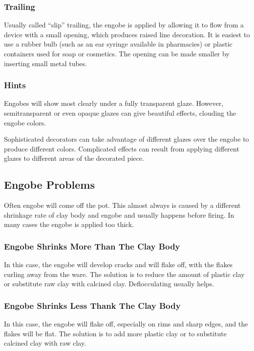 \subsubsection{Trailing}
Usually called ``slip'' trailing, the engobe is applied by allowing it to flow 
from a device with a small opening, which produces raised line decoration. It 
is easiest to use a rubber bulb (such as an ear syringe available in 
pharmacies) or plastic containers used for soap or cosmetics. The opening can 
be made smaller by inserting small metal tubes.
\subsubsection{Hints}
Engobes will show most clearly under a fully transparent glaze. However, 
semitransparent or even opaque glazes can give beautiful effects, clouding the 
engobe colors.

Sophisticated decorators can take advantage of different glazes over the engobe 
to produce different colors. Complicated effects can result from applying 
different glazes to different areas of the decorated piece.
\subsection{Engobe Problems}
Often engobe will come off the pot. This almost always is caused by a different 
shrinkage rate of clay body and engobe and usually happens before firing. In 
many cases the engobe is applied too thick.
\subsubsection{Engobe Shrinks More Than The Clay Body}
In this case, the engobe will develop cracks and will flake off, with the 
flakes curling away from the ware. The solution is to reduce the amount of 
plastic clay or substitute raw clay with calcined clay. Deflocculating usually 
helps.
\subsubsection{Engobe Shrinks Less Thank The Clay Body}
In this case, the engobe will flake off, especially on rims and sharp edges, 
and the flakes will be flat. The solution is to add more plastic clay or to 
substitute calcined clay with raw clay.
